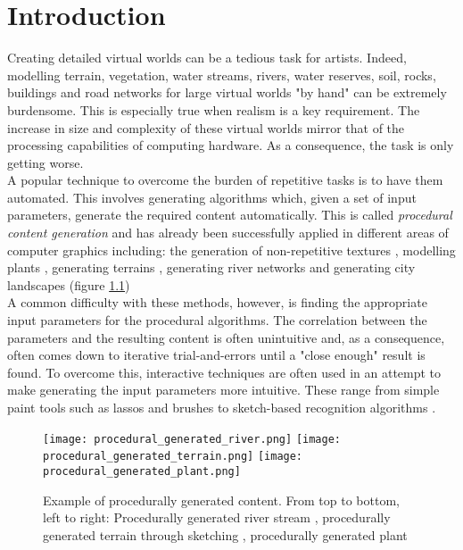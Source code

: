 
\chapter{Introduction}
\par
Creating detailed virtual worlds can be a tedious task for artists. Indeed, modelling terrain, vegetation, water streams, rivers, water reserves, soil, rocks, buildings and road networks for large virtual worlds "by hand" can be extremely burdensome. This is especially true when realism is a key requirement. The increase in size and complexity of these virtual worlds mirror that of the processing capabilities of computing hardware. As a consequence, the task is only getting worse.\\

A popular technique to overcome the burden of repetitive tasks is to have them automated. This involves generating algorithms which, given a set of input parameters, generate the required content automatically. This is called \textit{procedural content generation} and has already been successfully applied in different areas of computer graphics including: the generation of non-repetitive textures \cite{Efros1999,Liang2001,Wei2009}, modelling plants \cite{Boudon2012,Fourcaud2008,Guo2011,Lewis1999}, generating terrains \cite{Smelik2009,Gain2009,Doran2010}, generating river networks \cite{Derzapf2011,Emilien} and generating city landscapes \cite{Gain,Kelly2007,Parish2001} (figure \ref{Example of procedurally generated content}) \\
A common difficulty with these methods, however, is finding the appropriate input parameters for the procedural algorithms. The correlation between the parameters and the resulting content is often unintuitive and, as a consequence, often comes down to iterative trial-and-errors until a "close enough" result is found. To overcome this, interactive techniques are often used in an attempt to make generating the input parameters more intuitive. These range from simple paint tools such as lassos and brushes \cite{Emilien} to sketch-based recognition algorithms \cite{Gain2009}. \\

\begin{figure}[h]
  \centering
	\label{Example of procedurally generated content}
	\texttt{[image: procedural\_generated\_river.png]}
	\texttt{[image: procedural\_generated\_terrain.png]}
	\texttt{[image: procedural\_generated\_plant.png]}
	\caption{Example of procedurally generated content. From top to bottom, left to right: Procedurally generated river stream \cite{Derzapf2011}, procedurally generated terrain through sketching \cite{Gain2009}, procedurally generated plant \cite{Soler2001}}
\end{figure}

